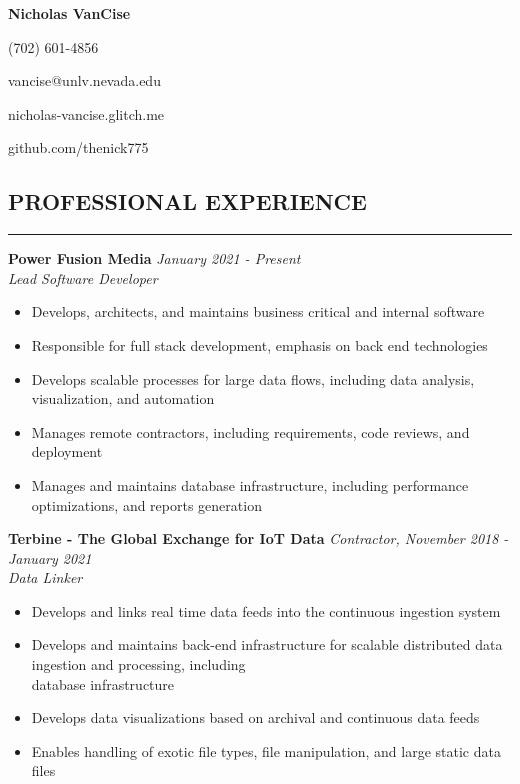 \documentclass{res}
\begin{document}
	\thispagestyle{empty} %
	\centerline{\bf \Large{Nicholas VanCise}}
	\centerline{(702) 601-4856}
	\centerline{vancise@unlv.nevada.edu}
  \centerline{nicholas-vancise.glitch.me}
  \centerline{github.com/thenick775}
  \vspace{-18pt}

	\begin{resume}

		\section{{PROFESSIONAL EXPERIENCE}}
    \noindent\rule[0.5ex]{\linewidth}{1pt}
    		{\bf Power Fusion Media} \hfill \emph{January 2021 - Present} \\
			\emph{Lead Software Developer}

			\begin{itemize} \itemsep -2pt
				\item Develops, architects, and maintains business critical and internal software
				\item Responsible for full stack development, emphasis on back end technologies
				\item Develops scalable processes for large data flows, including data analysis, visualization, and automation
				\item Manages remote contractors, including requirements, code reviews, and deployment
        \item Manages and maintains database infrastructure, including performance optimizations, and reports generation
			\end{itemize} \vspace{-2mm}
    
		{\bf Terbine - The Global Exchange for IoT Data} \hfill \emph{Contractor, November 2018 - January 2021} \\
			\emph{Data Linker}

			\begin{itemize} \itemsep -2pt
				\item Develops and links real time data feeds into the continuous ingestion system
				\item Develops and maintains back-end infrastructure for scalable distributed data ingestion and processing, including \  \\
        database infrastructure
				\item Develops data visualizations based on archival and continuous data feeds
				\item Enables handling of exotic file types, file manipulation, and large static data files
			\end{itemize} \vspace{-2mm}


\end{resume}
\end{document}

